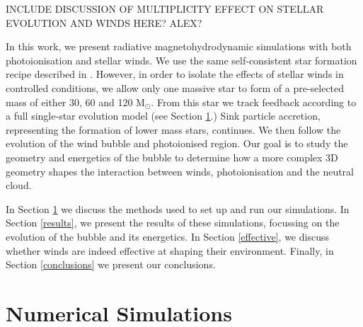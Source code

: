 \documentclass[a4paper,fleqn,usenatbib]{mnras}
\newcommand{\Msolar}{M$_{\odot}$\xspace}
\begin{document}
INCLUDE DISCUSSION OF MULTIPLICITY EFFECT ON STELLAR EVOLUTION AND WINDS HERE? ALEX?

In this work, we present radiative magnetohydrodynamic simulations with both photoionisation and stellar winds. We use the same self-consistent star formation recipe described in \cite{Geen2018}. However, in order to isolate the effects of stellar winds in controlled conditions, we allow only one massive star to form of a pre-selected mass of either 30, 60 and 120 \Msolar. From this star we track feedback according to a full single-star evolution model (see Section \ref{methods}.) Sink particle accretion, representing the formation of lower mass stars, continues. We then follow the evolution of the wind bubble and photoionised region. Our goal is to study the geometry and energetics of the bubble to determine how a more complex 3D geometry shapes the interaction between winds, photoionisation and the neutral cloud.

In Section \ref{methods} we discuss the methods used to set up and run our simulations. In Section \ref{results}, we present the results of these simulations, focussing on the evolution of the bubble and its energetics. In Section \ref{effective}, we discuss whether winds are indeed effective at shaping their environment. Finally, in Section \ref{conclusions} we present our conclusions.

\section{Numerical Simulations}
\label{methods}
\end{document}
